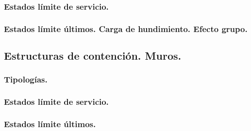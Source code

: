 \subsubsection{Estados límite de servicio.}

\subsubsection{Estados límite últimos. Carga de hundimiento. Efecto grupo.}

\subsection{Estructuras de contención. Muros.}

\subsubsection{Tipologías.}

\subsubsection{Estados límite de servicio.}

\subsubsection{Estados límite últimos.}